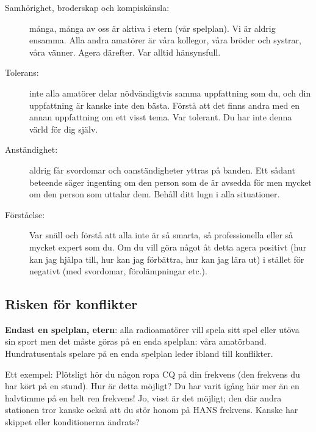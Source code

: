 \begin{description}
\item[Samhörighet, broderskap och kompiskänsla:] många, många av oss
  är aktiva i etern (vår spelplan).
  Vi är aldrig ensamma.
  Alla andra amatörer är våra kollegor, våra bröder och systrar, våra vänner.
  Agera därefter.
  Var alltid hänsynsfull.

\item[Tolerans:] inte alla amatörer delar nödvändigtvis samma
  uppfattning som du, och din uppfattning är kanske inte den bästa.
  Förstå att det finns andra med en annan uppfattning om ett visst tema.
  Var tolerant.
  Du har inte denna värld för dig själv.

\item[Anständighet:] aldrig får svordomar och oanständigheter yttras
  på banden.
  Ett sådant beteende säger ingenting om den person som de är avsedda för men
  mycket om den person som uttalar dem.
  Behåll ditt lugn i alla situationer.

\item[Förståelse:] Var snäll och förstå att alla inte är så smarta,
  så professionella eller så mycket expert som du.
  Om du vill göra något åt detta agera positivt (hur kan jag hjälpa till,
  hur kan jag förbättra, hur kan jag lära ut) i stället för negativt
  (med svordomar, förolämpningar etc.).
\end{description}

\subsection{Risken för konflikter}
\textbf{Endast en spelplan, etern}: alla radioamatörer vill spela sitt spel
eller utöva sin sport men det måste göras på en enda spelplan: våra amatörband.
Hundratusentals spelare på en enda spelplan leder ibland till konflikter.

Ett exempel: Plötsligt hör du någon ropa CQ på din frekvens (den frekvens du
har kört på en stund).
Hur är detta möjligt?
Du har varit igång här mer än en halvtimme på en helt ren frekvens!
Jo, visst är det möjligt; den där andra stationen tror kanske också att du stör
honom på HANS frekvens.
Kanske har skippet eller konditionerna ändrats?

